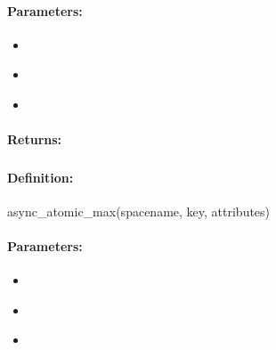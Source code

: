 \paragraph{Parameters:}
\begin{itemize}[noitemsep]
\item {}\\

\item {}\\

\item {}\\

\end{itemize}

\paragraph{Returns:}


\pagebreak
\subsubsection{}
\label{api:ruby:async_atomic_max}


\paragraph{Definition:}
\begin{rubycode}
async_atomic_max(spacename, key, attributes)
\end{rubycode}

\paragraph{Parameters:}
\begin{itemize}[noitemsep]
\item {}\\

\item {}\\

\item {}\\

\end{itemize}

